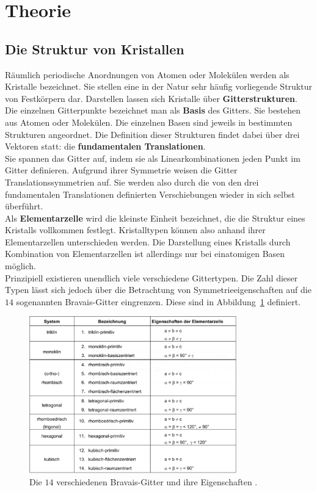 \section{Theorie}
\label{sec:theorie}
%
\subsection{Die Struktur von Kristallen}
%
Räumlich periodische Anordnungen von Atomen oder Molekülen werden als Kristalle bezeichnet. Sie stellen eine
in der Natur sehr häufig vorliegende Struktur von Festkörpern dar. Darstellen lassen sich Kristalle über
\textbf{Gitterstrukturen}. Die einzelnen Gitterpunkte bezeichnet man als \textbf{Basis} des Gitters. Sie bestehen
aus Atomen oder Molekülen. Die einzelnen Basen sind jeweils in bestimmten Strukturen angeordnet. Die Definition
dieser Strukturen findet dabei über drei Vektoren statt: die \textbf{fundamentalen Translationen}.\\
Sie spannen das Gitter auf, indem sie als Linearkombinationen jeden Punkt im Gitter definieren. Aufgrund ihrer
Symmetrie weisen die Gitter Translationssymmetrien auf. Sie werden also durch die von den drei fundamentalen
Translationen definierten Verschiebungen wieder in sich selbst überführt. \\
Als \textbf{Elementarzelle} wird die kleinste Einheit bezeichnet, die die Struktur eines Kristalls vollkommen
festlegt. Kristalltypen können also anhand ihrer Elementarzellen unterschieden werden. Die Darstellung eines
Kristalls durch Kombination von Elementarzellen ist allerdings nur bei einatomigen Basen möglich.\\
Prinzipiell existieren unendlich viele verschiedene Gittertypen. Die Zahl dieser Typen lässt sich jedoch über
die Betrachtung von Symmetrieeigenschaften auf die $14$ sogenannten Bravais-Gitter eingrenzen. Diese sind in
Abbildung~\ref{fig:bravais} definiert.
%
\begin{figure}[htb]
  \centering
  \includegraphics[width=0.8\textwidth]{figures/plot_bravais.pdf}
  \caption{Die $14$ verschiedenen Bravais-Gitter und ihre Eigenschaften \cite{V41}.}
  \label{fig:bravais}
\end{figure}
%
